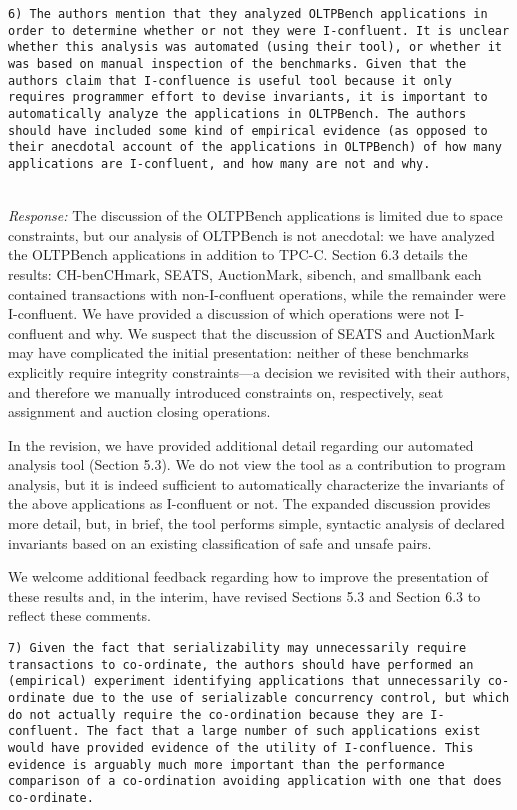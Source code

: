 \documentclass[10pt]{article}
\newcommand{\reviewer}[1] {\noindent\colorbox{reviewercolor}{\parbox{\textwidth}{\noindent\texttt{#1}}}\\}
\newcommand{\response}[1] {\noindent\textit{Response: } #1\\}
\begin{document}
\reviewer{6) The authors mention that they analyzed OLTPBench
  applications in order to determine whether or not they were
  I-confluent. It is unclear whether this analysis was automated
  (using their tool), or whether it was based on manual inspection of
  the benchmarks. Given that the authors claim that I-confluence is
  useful tool because it only requires programmer effort to devise
  invariants, it is important to automatically analyze the
  applications in OLTPBench. The authors should have included some
  kind of empirical evidence (as opposed to their anecdotal account of
  the applications in OLTPBench) of how many applications are
  I-confluent, and how many are not and why. }

\response{The discussion of the OLTPBench applications is limited due
  to space constraints, but our analysis of OLTPBench is not
  anecdotal: we have analyzed the OLTPBench applications in addition
  to TPC-C. Section 6.3 details the results: CH-benCHmark, SEATS,
  AuctionMark, sibench, and smallbank each contained transactions with
  non-I-confluent operations, while the remainder were I-confluent. We
  have provided a discussion of which operations were not I-confluent
  and why. We suspect that the discussion of SEATS and AuctionMark may
  have complicated the initial presentation: neither of these
  benchmarks explicitly require integrity constraints---a decision we
  revisited with their authors, and therefore we manually introduced
  constraints on, respectively, seat assignment and auction closing operations.

  In the revision, we have provided additional detail regarding our
  automated analysis tool (Section 5.3). We do not view the tool as a
  contribution to program analysis, but it is indeed sufficient to
  automatically characterize the invariants of the above applications
  as I-confluent or not. The expanded discussion provides more detail,
  but, in brief, the tool performs simple, syntactic analysis of
  declared invariants based on an existing classification of safe and
  unsafe pairs.

  We welcome additional feedback regarding how to improve the
  presentation of these results and, in the interim, have revised
  Sections 5.3 and Section 6.3 to reflect these comments.}

\reviewer{7) Given the fact that serializability may unnecessarily
  require transactions to co-ordinate, the authors should have
  performed an (empirical) experiment identifying applications that
  unnecessarily co-ordinate due to the use of serializable concurrency
  control, but which do not actually require the co-ordination because
  they are I-confluent. The fact that a large number of such
  applications exist would have provided evidence of the utility of
  I-confluence. This evidence is arguably much more important than the
  performance comparison of a co-ordination avoiding application with
  one that does co-ordinate.}
\end{document}
